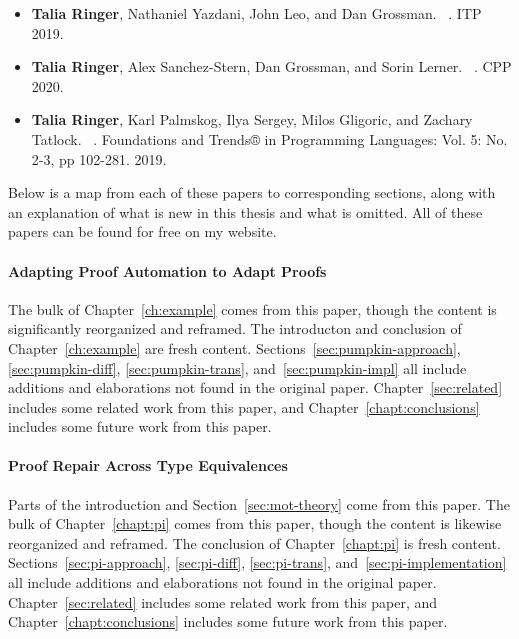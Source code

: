 \begin{itemize}
\item \textbf{Talia Ringer}, Nathaniel Yazdani, John Leo, and Dan Grossman. ~\cite{Ringer2019}. ITP 2019.
\item \textbf{Talia Ringer}, Alex Sanchez-Stern, Dan Grossman, and Sorin Lerner. ~\cite{replica}. CPP 2020.
\item \textbf{Talia Ringer}, Karl Palmskog, Ilya Sergey, Milos Gligoric, and Zachary Tatlock. ~\cite{PGL-045}. Foundations and Trends® in Programming Languages: Vol. 5: No. 2-3, pp 102-281. 2019. 
\end{itemize}
Below is a map from each of these papers to corresponding sections,
along with an explanation of what is new in this thesis and what is omitted.
All of these papers can be found for free on my website.

\paragraph{Adapting Proof Automation to Adapt Proofs}
The bulk of Chapter~\ref{ch:example} comes from this paper,
though the content is significantly reorganized and reframed.
The introducton and conclusion of Chapter~\ref{ch:example} are fresh content.
Sections~\ref{sec:pumpkin-approach}, \ref{sec:pumpkin-diff}, \ref{sec:pumpkin-trans}, and~\ref{sec:pumpkin-impl}
all include additions and elaborations not found in the original paper.
Chapter~\ref{sec:related} includes some related work from this paper,
and Chapter~\ref{chapt:conclusions} includes some future work from this paper.

\paragraph{Proof Repair Across Type Equivalences}
Parts of the introduction and Section~\ref{sec:mot-theory} come from this paper.
The bulk of Chapter~\ref{chapt:pi} comes from this paper,
though the content is likewise reorganized and reframed.
The conclusion of Chapter~\ref{chapt:pi} is fresh content.
Sections~\ref{sec:pi-approach}, \ref{sec:pi-diff}, \ref{sec:pi-trans}, and~\ref{sec:pi-implementation}
all include additions and elaborations not found in the original paper.
Chapter~\ref{sec:related} includes some related work from this paper,
and Chapter~\ref{chapt:conclusions} includes some future work from this paper.

